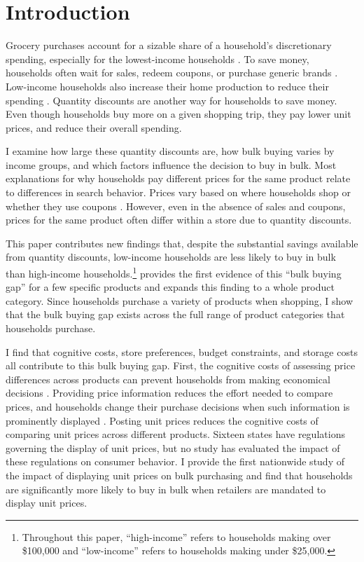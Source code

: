 \documentclass[AER]{AEA_mal}
\begin{document}
\maketitle

\newpage

\section{Introduction}
Grocery purchases account for a sizable share of a household's discretionary spending, especially for the lowest-income households \citep{bls2017}. To save money, households often wait for sales, redeem coupons, or purchase generic brands \citep{nevo2009}. Low-income households also increase their home production to reduce their spending \citep{aguiar2005}. Quantity discounts are another way for households to save money. Even though households buy more on a given shopping trip, they pay lower unit prices, and reduce their overall spending.

I examine how large these quantity discounts are, how bulk buying varies by income groups, and which factors influence the decision to buy in bulk. Most explanations for why households pay different prices for the same product relate to differences in search behavior. Prices vary based on where households shop or whether they use coupons \citep{talukdar2008,nevo2009}. However, even in the absence of sales and coupons, prices for the same product often differ within a store due to quantity discounts.

This paper contributes new findings that, despite the substantial savings available from quantity discounts, low-income households are less likely to buy in bulk than high-income households.\footnote{Throughout this paper, ``high-income'' refers to households making over \$100,000 and ``low-income'' refers to households making under \$25,000.} \citet{kunreuther1973} provides the first evidence of this ``bulk buying gap'' for a few specific products and \citet{orhun2018} expands this finding to a whole product category. Since households purchase a variety of products when shopping, I show that the bulk buying gap exists across the full range of product categories that households purchase.

I find that cognitive costs, store preferences, budget constraints, and storage costs all contribute to this bulk buying gap. First, the cognitive costs of assessing price differences across products can prevent households from making economical decisions \citep{mitchell2003}. Providing price information reduces the effort needed to compare prices, and households change their purchase decisions when such information is  prominently displayed \citep{chetty2009, bogomolova2016}. Posting unit prices reduces the cognitive costs of comparing unit prices across different products. Sixteen states have regulations governing the display of unit prices, but no study has evaluated the impact of these regulations on consumer behavior. I provide the first nationwide study of the impact of displaying unit prices on bulk purchasing and find that households are significantly more likely to buy in bulk when retailers are mandated to display unit prices.
\end{document}
